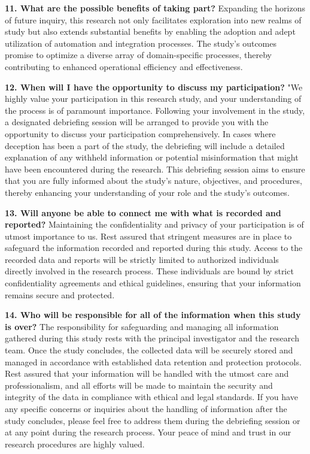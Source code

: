 \documentclass{article}
\begin{document}
\textbf{11.	What are the possible benefits of taking part?} Expanding the horizons of future inquiry, this research not only facilitates exploration into new realms of study but also extends substantial benefits by enabling the adoption and adept utilization of automation and integration processes. The study's outcomes promise to optimize a diverse array of domain-specific processes, thereby contributing to enhanced operational efficiency and effectiveness.

\textbf{12.	When will I have the opportunity to discuss my participation?} "We highly value your participation in this research study, and your understanding of the process is of paramount importance. Following your involvement in the study, a designated debriefing session will be arranged to provide you with the opportunity to discuss your participation comprehensively. In cases where deception has been a part of the study, the debriefing will include a detailed explanation of any withheld information or potential misinformation that might have been encountered during the research. This debriefing session aims to ensure that you are fully informed about the study's nature, objectives, and procedures, thereby enhancing your understanding of your role and the study's outcomes.

\textbf{13.	Will anyone be able to connect me with what is recorded and reported?} Maintaining the confidentiality and privacy of your participation is of utmost importance to us. Rest assured that stringent measures are in place to safeguard the information recorded and reported during this study. Access to the recorded data and reports will be strictly limited to authorized individuals directly involved in the research process. These individuals are bound by strict confidentiality agreements and ethical guidelines, ensuring that your information remains secure and protected.

\textbf{14.	Who will be responsible for all of the information when this study is over?} The responsibility for safeguarding and managing all information gathered during this study rests with the principal investigator and the research team. Once the study concludes, the collected data will be securely stored and managed in accordance with established data retention and protection protocols. Rest assured that your information will be handled with the utmost care and professionalism, and all efforts will be made to maintain the security and integrity of the data in compliance with ethical and legal standards. If you have any specific concerns or inquiries about the handling of information after the study concludes, please feel free to address them during the debriefing session or at any point during the research process. Your peace of mind and trust in our research procedures are highly valued.
\end{document}
